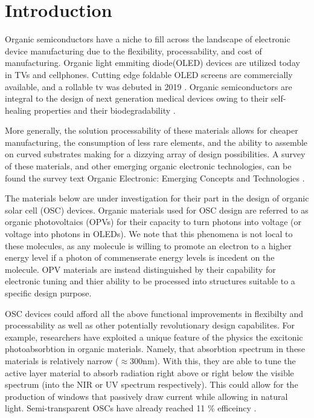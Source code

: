 \chapter{Introduction} 

Organic semiconductors have a niche to fill across the landscape of electronic
device manufacturing due to the flexibility, processability, and cost of manufacturing. 
Organic light emmiting diode(OLED) devices are utilized today in TVs and cellphones.  
Cutting edge foldable OLED screens are commercially available, and a rollable tv was debuted in 2019
\cite{Chen2020}. 
Organic semiconductors are integral to the design of next generation medical devices owing to their
self-healing properties and their biodegradability \cite{Bettinger2010}. 

More generally, the solution processability of these materials allows for
cheaper manufacturing, the consumption of less rare elements, 
and the ability to assemble on curved substrates making for a dizzying array of design possibilities. 
A survey of these materials, and 
other emerging organic electronic technologies, can be found the survey text 
Organic Electronic: Emerging Concepts and Technologies
\cite{FabioCicoiraEditor2013}. 

The materials below are under investigation for their part in the design of organic solar cell (OSC) devices. 
Organic materials used for OSC design are referred to as organic photovoltaics (OPVs) for their capacity
to turn photons into voltage (or voltage into photons in OLEDs). We note that this phenomena is not
local to these molecules, as any molecule is willing to promote an electron to a higher energy level if a
photon of commenserate energy levels is incedent on the molecule. OPV materials are instead distinguished by
their capability for electronic tuning and thier ability to be processed into structures suitable to a specific
design purpose.

OSC devices could afford all the above functional improvements in flexibilty and processability as well as other
potentially revolutionary design capabilites.  
For example, researchers have exploited a unique feature of the physics the excitonic photoabsorbtion in 
organic materials.  Namely, that absorbtion spectrum
in these materials is relatively narrow ($\approx$300nm).
With this, they are able to tune the active layer material to absorb radiation right above or right below the
visible spectrum (into the NIR or UV spectrum respectively). This 
could allow for the production of windows that passively draw current while allowing in natural light. Semi-transparent OSCs have already
reached 11 \% efficeincy \cite{Brabec2020}. 

